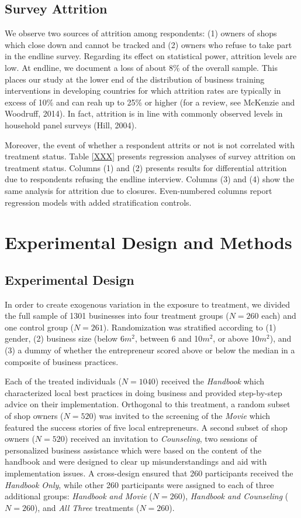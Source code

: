 \documentclass[11.5pt]{article}
\begin{document}
\subsection{Survey Attrition}

We observe two sources of attrition among respondents: (1) owners of shops which close down and cannot be tracked and (2) owners who refuse to take part in the endline survey. Regarding its effect on statistical power, attrition levels are low. At endline, we document a loss of about 8\% of the overall sample. This places our study at the lower end of the distribution of business training interventions in developing countries for which attrition rates are typically in excess of 10\% and can reah up to 25\% or higher (for a review, see McKenzie and Woodruff, 2014). In fact, attrition is in line with commonly observed levels in household panel surveys (Hill, 2004).

Moreover, the event of whether a respondent attrits or not is not correlated with treatment status. Table \ref{XXX} presents regression analyses of survey attrition on treatment status. Columns (1) and (2) presents results for differential attrition due to respondents refusing the endline interview. Columns (3) and (4) show the same analysis for attrition due to closures. Even-numbered columns report regression models with added stratification controls.


\section{\textbf{Experimental Design and Methods}}

\subsection{Experimental Design}

In order to create exogenous variation in the exposure to treatment, we divided the full sample of 1301 businesses into four treatment groups ($N = 260$ each) and one control group ($N = 261$). Randomization was stratified according to (1) gender, (2) business size (below 6$m^2$, between 6 and 10$m^2$, or above 10$m^2$), and (3) a dummy of whether the entrepreneur scored above or below the median in a composite of business practices.

Each of the treated individuals ($N = 1040$) received the \emph{Handbook} which characterized local best practices in doing business and provided step-by-step advice on their implementation. Orthogonal to this treatment, a random subset of shop owners ($N = 520$) was invited to the screening of the \emph{Movie} which featured the success stories of five local entrepreneurs. A second subset of shop owners ($N = 520$) received an invitation to \emph{Counseling}, two sessions of personalized business assistance which were based on the content of the handbook and were designed to clear up misunderstandings and aid with implementation issues. A cross-design ensured that 260 participants received the \emph{Handbook Only}, while other 260 participants were assigned to each of three additional groups: \emph{Handbook and Movie} ($N = 260$), \emph{Handbook and Counseling} ($N = 260$), and \emph{All Three} treatments ($N = 260$).
\end{document}

